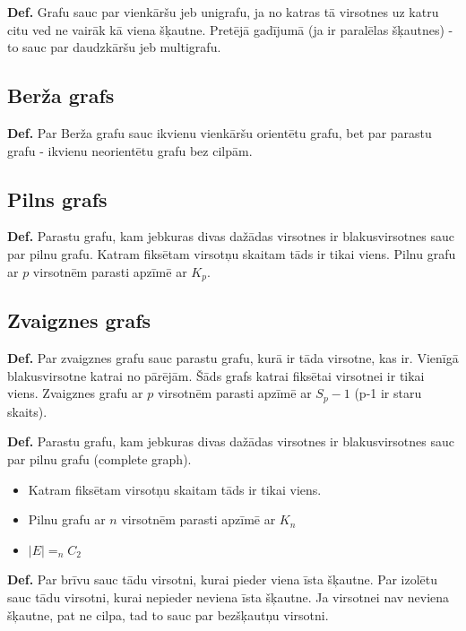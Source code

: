 \documentclass{article}
\begin{document}
\textbf{Def.} Grafu sauc par vienkāršu jeb unigrafu, ja no katras tā virsotnes uz katru citu ved ne vairāk kā viena šķautne. Pretējā gadījumā (ja ir paralēlas šķautnes) - to sauc par daudzkāršu jeb multigrafu.


\subsection{Berža grafs}

\textbf{Def.} Par Berža grafu sauc ikvienu vienkāršu orientētu grafu, bet par parastu grafu - ikvienu neorientētu grafu bez cilpām. 


\subsection{Pilns grafs}

\textbf{Def.} Parastu grafu, kam jebkuras divas dažādas virsotnes ir blakusvirsotnes sauc par pilnu grafu. Katram fiksētam virsotņu skaitam tāds ir tikai viens. Pilnu grafu ar $p$ virsotnēm parasti apzīmē ar $K_p$.

\subsection{Zvaigznes grafs}

\textbf{Def.} Par zvaigznes grafu sauc parastu grafu, kurā ir tāda virsotne, kas ir. Vienīgā blakusvirsotne katrai no pārējām.  Šāds grafs katrai fiksētai virsotnei ir tikai viens. Zvaigznes grafu ar $p$ virsotnēm parasti apzīmē ar $S_p−1$ (p-1 ir staru skaits).


\textbf{Def.}  Parastu grafu, kam jebkuras divas dažādas virsotnes ir blakusvirsotnes sauc par pilnu grafu (complete graph).

\begin{itemize}
	\item Katram fiksētam virsotņu skaitam tāds ir tikai viens.
	\item Pilnu grafu ar $n$ virsotnēm parasti apzīmē ar $K_n$ 
	\item $|E | =_n C_2$
\end{itemize}

\textbf{Def.}  Par brīvu sauc tādu virsotni, kurai pieder viena īsta šķautne. Par izolētu sauc tādu virsotni, kurai nepieder neviena īsta šķautne.  Ja virsotnei nav neviena šķautne, pat ne cilpa, tad to sauc par bezšķautņu virsotni.
\end{document}
